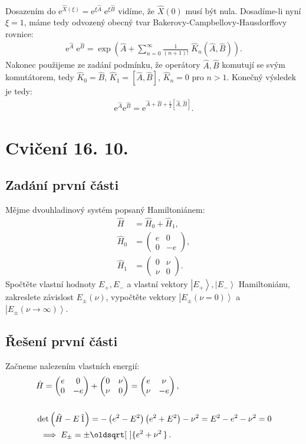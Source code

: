 \documentclass[10pt,a4paper]{article}
\renewcommand*{\sqrt}[2][\ ]{\oldsqrt[#1]{#2\,}\,}
\newcommand{\comm}[2]{\left[ #1, #2 \right]}
\newcommand{\const}[1]{\text{#1}}
\newcommand{\mat}[1]{
    \begin{pmatrix}
        #1
    \end{pmatrix}
}
\newcommand{\ket}[1]{\left| #1 \right>}
\newcommand{\e}[1]{\const{e}^{#1}}
\begin{document}
Dosazením do $\e{\hat X(\xi)} = \e{\xi \hat A} \; \e{\xi \hat B}$ vidíme, že $\hat X(0)$ musí být nula. Dosadíme-li nyní $\xi=1$, máme tedy odvozený obecný tvar Bakerovy-Campbellovy-Hausdorffovy rovnice:
\begin{align*}
    \e{\hat A} \; \e{\hat B} = \exp \left(
        \hat A + \sum_{n=0}^\infty \frac{1}{(n+1)!} \; \hat K_n(\hat A, \hat B)
    \right).
\end{align*}
Nakonec použijeme ze zadání podmínku, že operátory $\hat A, \hat B$ komutují se svým komutátorem, tedy $\hat K_0 = \hat B$, $\hat K_1 = \comm{\hat A}{\hat B}$, $\hat K_n = 0$ pro $n>1$. Konečný výsledek je tedy:
\begin{align*}
    \e{\hat A}\e{\hat B} = \e{\hat A + \hat B + \tfrac{1}{2} \comm{\hat A}{\hat B}}.
\end{align*}


\pagebreak
\section{Cvičení 16. 10.}

\subsection{Zadání první části}
Mějme dvouhladinový systém popsaný Hamiltoniánem:
\begin{align*}
    \hat H &= \hat H_0 + \hat H_1,
    \\[5pt]
    \hat H_0 &= \mat{e & 0 \\ 0 & -e},
    \\[5pt]
    \hat H_1 &= \mat{0 & \nu \\ \nu & 0}.
\end{align*}
Spočtěte vlastní hodnoty $E_{+}, E_{-}$ a vlastní vektory $\ket{E_{+}}, \ket{E_{-}}$ Hamiltoniánu, zakreslete závislost $E_{\pm}(\nu)$, vypočtěte vektory $\ket{E_{\pm}(\nu=0)}$ a $\ket{E_{\pm}(\nu\to\infty)}$.

\subsection{Řešení první části}
Začneme nalezením vlastních energií:
\begin{align*}
    &\hat H
    = \mat{ e & 0 \\ 0 & -e } + \mat{ 0 & \nu \\ \nu & 0 }
    = \mat{ e & \nu \\ \nu & -e },
    \\[15pt]
    &\det\left( \hat H - E \, \hat 1 \right)
    = -\left( e^2 - E^2 \right) \left( e^2 + E^2 \right) - \nu^2
    = E^2 - e^2 - \nu^2
    = 0
    \\
    & \; \implies E_{\pm} = \pm \sqrt{ e^2 + \nu^2 }.
    \\
\end{align*}
\end{document}
